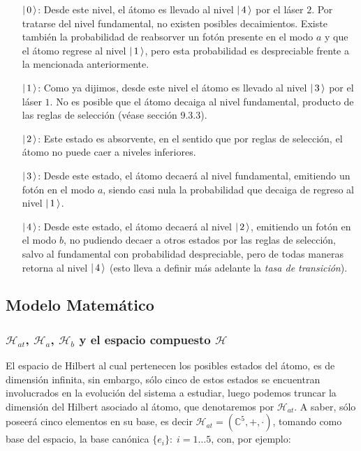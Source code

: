 \begin{itemize}
 \item[$\vert\, 0 \,\rangle$: ] Desde este nivel, el \'atomo es llevado al nivel $\vert\, 4 \,\rangle$ por el l\'aser $2$. Por tratarse del nivel fundamental, no existen posibles decaimientos. Existe tambi\'en la probabilidad de reabsorver un fot\'on presente en el modo $a$ y que el \'atomo regrese al nivel $\vert\, 1 \,\rangle$, pero esta probabilidad es despreciable frente a la mencionada anteriormente.

\item[$\vert\, 1 \,\rangle$: ] Como ya dijimos, desde este nivel el \'atomo es llevado al nivel $\vert\, 3 \,\rangle$ por el l\'aser $1$. No es posible que el \'atomo decaiga al nivel fundamental, producto de las reglas de selecci\'on (v\'ease \cite{griffiths} secci\'on 9.3.3).

\item[$\vert\, 2 \,\rangle$: ] Este estado es absorvente, en el sentido que por reglas de selecci\'on, el \'atomo no puede caer a niveles inferiores.

\item[$\vert\, 3 \,\rangle$: ] Desde este estado, el \'atomo decaer\'a al nivel fundamental, emitiendo un fot\'on en el modo $a$, siendo casi nula la probabilidad que decaiga de regreso al nivel $\vert\, 1 \,\rangle$.

\item[$\vert\, 4 \,\rangle$: ] Desde este estado, el \'atomo decaer\'a al nivel $\vert\, 2 \,\rangle$, emitiendo un fot\'on en el modo $b$, no pudiendo decaer a otros estados por las reglas de selecci\'on, salvo al fundamental con probabilidad despreciable, pero de todas maneras retorna al nivel $\vert\, 4 \,\rangle$ (esto lleva a definir m\'as adelante la \emph{tasa de transici\'on}).
\end{itemize}

\subsection{Modelo Matem\'atico}\label{sec:modelo_matematico}
\subsubsection{$\mathcal{H}_{at}$, $\mathcal{H}_a$, $\mathcal{H}_b$ y el espacio compuesto $\mathcal{H}$}\label{HatHaHb}

\quad El espacio de Hilbert al cual pertenecen los posibles estados del \'atomo, es de dimensi\'on infinita, sin embargo, s\'olo cinco de estos estados se encuentran involucrados en la evoluci\'on del sistema a estudiar, luego podemos truncar la dimensi\'on del Hilbert asociado al \'atomo, que denotaremos por $\mathcal{H}_{at}$. A saber, s\'olo poseer\'a cinco elementos en su base, es decir $\mathcal{H}_{at}=\left(\mathbb{C}^5,+,\cdot\right)$, tomando como base del espacio, la base can\'onica $\{e_i\}:\;i=1\ldots 5$, con, por ejemplo:

